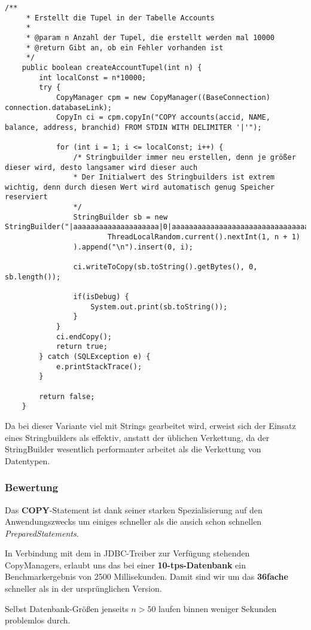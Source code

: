 \begin{lstlisting}[caption={createAccountTupel mit CopyManager}]
	/**
	 * Erstellt die Tupel in der Tabelle Accounts
	 * 
	 * @param n Anzahl der Tupel, die erstellt werden mal 10000
	 * @return Gibt an, ob ein Fehler vorhanden ist
	 */
	public boolean createAccountTupel(int n) {
		int localConst = n*10000;
		try {
			CopyManager cpm = new CopyManager((BaseConnection) connection.databaseLink);
			CopyIn ci = cpm.copyIn("COPY accounts(accid, NAME, balance, address, branchid) FROM STDIN WITH DELIMITER '|'");
			
			for (int i = 1; i <= localConst; i++) {
				/* Stringbuilder immer neu erstellen, denn je größer dieser wird, desto langsamer wird dieser auch
				* Der Initialwert des Stringbuilders ist extrem wichtig, denn durch diesen Wert wird automatisch genug Speicher reserviert
				*/
				StringBuilder sb = new StringBuilder("|aaaaaaaaaaaaaaaaaaaa|0|aaaaaaaaaaaaaaaaaaaaaaaaaaaaaaaaaaaaaaaaaaaaaaaaaaaaaaaaaaaaaaaaaaaa|").append(
						ThreadLocalRandom.current().nextInt(1, n + 1)
				).append("\n").insert(0, i);
				
				ci.writeToCopy(sb.toString().getBytes(), 0, sb.length());
				
				if(isDebug) {
					System.out.print(sb.toString());
				}
			}
	        ci.endCopy();			
			return true;
		} catch (SQLException e) {
			e.printStackTrace();
		}
		
		return false;
	}
\end{lstlisting}

Da bei dieser Variante viel mit Strings gearbeitet wird, erweist sich der Einsatz eines 
Stringbuilders als effektiv, anstatt der üblichen Verkettung, da der StringBuilder wesentlich 
performanter arbeitet als die Verkettung von Datentypen.

\subsubsection*{Bewertung}
Das \textbf{COPY}-Statement ist dank seiner starken Spezialisierung auf den
Anwendungszwecks um einiges schneller als die ansich schon schnellen
\textit{PreparedStatements}.

In Verbindung mit dem in JDBC-Treiber zur Verfügung stehenden CopyManagers,
erlaubt uns das bei einer \textbf{10-tps-Datenbank} ein Benchmarkergebnis von
2500 Millisekunden. Damit sind wir um das \textbf{36fache} schneller als in der
ursprünglichen Version.

Selbst Datenbank-Größen jenseits $n > 50$ laufen binnen weniger Sekunden
problemlos durch.
\clearpage


